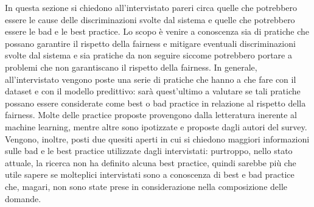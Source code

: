 In questa sezione si chiedono all'intervistato pareri circa quelle che potrebbero essere le cause delle discriminazioni svolte dal sistema e quelle che potrebbero essere le bad e le best practice. Lo scopo è venire a conoscenza sia di pratiche che possano garantire il rispetto della fairness e mitigare eventuali discriminazioni svolte dal sistema e sia pratiche da non seguire siccome potrebbero portare a problemi che non garantiscano il rispetto della fairness. In generale, all'intervistato vengono poste una serie di pratiche che hanno a che fare con il dataset e con il modello predittivo: sarà quest'ultimo a valutare se tali pratiche possano essere considerate come best o bad practice in relazione al rispetto della fairness. Molte delle practice proposte provengono dalla letteratura inerente al machine learning, mentre altre sono ipotizzate e proposte dagli autori del survey.\\
Vengono, inoltre, posti due quesiti aperti in cui si chiedono maggiori informazioni sulle bad e le best practice utilizzate dagli intervistati: purtroppo, nello stato attuale, la ricerca non ha definito alcuna best practice, quindi sarebbe più che utile sapere se molteplici intervistati sono a conoscenza di best e bad practice che, magari, non sono state prese in considerazione nella composizione delle domande.

